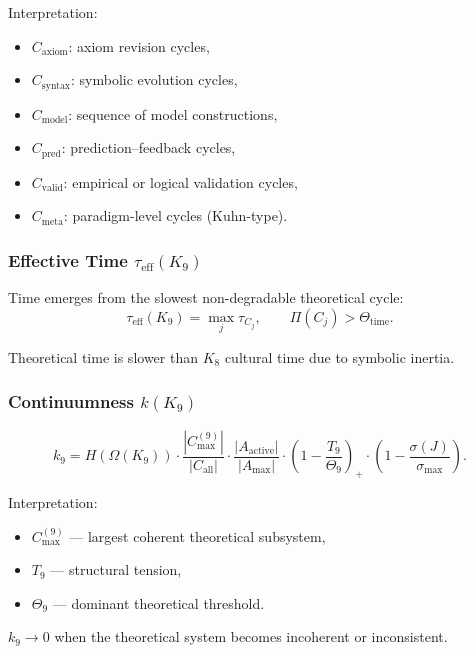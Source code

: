Interpretation:
\begin{itemize}
    \item $C_{\mathrm{axiom}}$: axiom revision cycles,
    \item $C_{\mathrm{syntax}}$: symbolic evolution cycles,
    \item $C_{\mathrm{model}}$: sequence of model constructions,
    \item $C_{\mathrm{pred}}$: prediction–feedback cycles,
    \item $C_{\mathrm{valid}}$: empirical or logical validation cycles,
    \item $C_{\mathrm{meta}}$: paradigm-level cycles (Kuhn-type).
\end{itemize}

\subsubsection{Effective Time \texorpdfstring{$\tau_{\mathrm{eff}}(K_9)$}{tau_eff(K9)}}

Time emerges from the slowest non-degradable theoretical cycle:
\[
\tau_{\mathrm{eff}}(K_9)=\max_j \tau_{C_j},
\qquad
\Pi(C_j) > \Theta_{\mathrm{time}}.
\]

Theoretical time is slower than $K_8$ cultural time due to symbolic inertia.

\subsubsection{Continuumness \texorpdfstring{$k(K_9)$}{k(K_9)}}

\[
k_9 =
H(\Omega(K_9))
\cdot
\frac{|C_{\max}^{(9)}|}{|C_{\mathrm{all}}|}
\cdot
\frac{|A_{\mathrm{active}}|}{|A_{\max}|}
\cdot
\left(1-\frac{T_9}{\Theta_9}\right)_+
\cdot
\left(1-\frac{\sigma(J)}{\sigma_{\max}}\right).
\]

Interpretation:
\begin{itemize}
    \item $C_{\max}^{(9)}$ — largest coherent theoretical subsystem,
    \item $T_9$ — structural tension,
    \item $\Theta_9$ — dominant theoretical threshold.
\end{itemize}

$k_9 \to 0$ when the theoretical system becomes incoherent or inconsistent.

